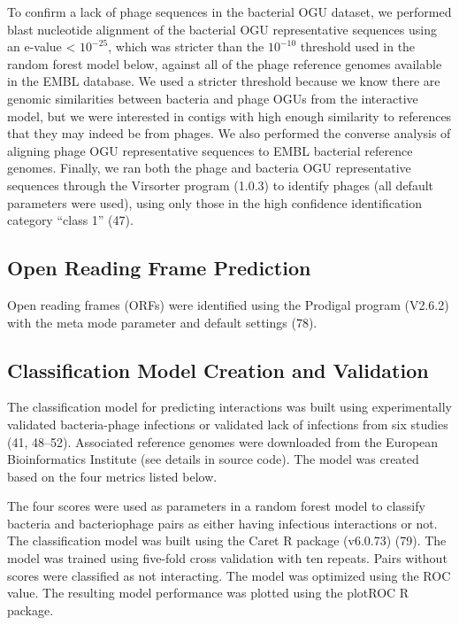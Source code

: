 \documentclass[12pt,]{article}
\begin{document}
To confirm a lack of phage sequences in the bacterial OGU dataset, we
performed blast nucleotide alignment of the bacterial OGU representative
sequences using an e-value \textless{} \(10^{-25}\), which was stricter
than the \(10^{-10}\) threshold used in the random forest model below,
against all of the phage reference genomes available in the EMBL
database. We used a stricter threshold because we know there are genomic
similarities between bacteria and phage OGUs from the interactive model,
but we were interested in contigs with high enough similarity to
references that they may indeed be from phages. We also performed the
converse analysis of aligning phage OGU representative sequences to EMBL
bacterial reference genomes. Finally, we ran both the phage and bacteria
OGU representative sequences through the Virsorter program (1.0.3) to
identify phages (all default parameters were used), using only those in
the high confidence identification category ``class 1'' (47).

\subsection{Open Reading Frame
Prediction}\label{open-reading-frame-prediction}

Open reading frames (ORFs) were identified using the Prodigal program
(V2.6.2) with the meta mode parameter and default settings (78).

\subsection{Classification Model Creation and
Validation}\label{classification-model-creation-and-validation}

The classification model for predicting interactions was built using
experimentally validated bacteria-phage infections or validated lack of
infections from six studies (41, 48--52). Associated reference genomes
were downloaded from the European Bioinformatics Institute (see details
in source code). The model was created based on the four metrics listed
below.

The four scores were used as parameters in a random forest model to
classify bacteria and bacteriophage pairs as either having infectious
interactions or not. The classification model was built using the Caret
R package (v6.0.73) (79). The model was trained using five-fold cross
validation with ten repeats. Pairs without scores were classified as not
interacting. The model was optimized using the ROC value. The resulting
model performance was plotted using the plotROC R package.
\end{document}
